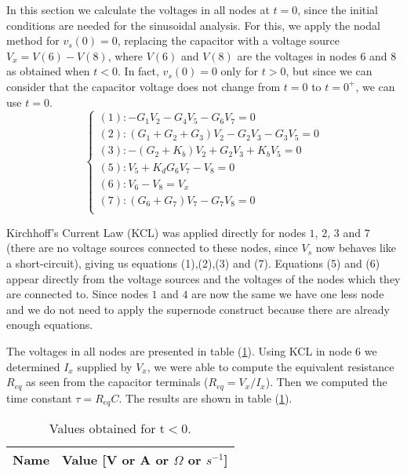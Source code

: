 In this section we calculate the voltages in all nodes at $t=0$, since the initial conditions are needed for the sinusoidal analysis. For this, we apply the nodal method for $v_{s}\left(0\right)=0$, replacing the capacitor with a voltage source $V_{x} = V\left(6\right)-V\left(8\right)$, where $V\left(6\right)$ and $V\left(8\right)$ are the voltages in nodes $6$ and $8$ as obtained when $t<0$. In fact, $v_{s}\left(0\right)=0$ only for $t>0$, but since we can consider that the capacitor voltage does not change from $t=0$ to $t=0^{+}$, we can use $t=0$.
\begin{equation}
  \begin{cases}
    \left(1\right): -G_{1}V_{2}-G_{4}V_{5}-G_{6}V_{7}=0                         \\
    \left(2\right): \left(G_{1}+G_{2}+G_{3}\right)V_{2}-G_{2}V_{3}-G_{3}V_{5}=0 \\
    \left(3\right): -\left(G_{2}+K_{b}\right)V_{2}+G_{2}V_{3}+K_{b}V_{5}=0      \\
    \left(5\right): V_{5}+K_{d}G_{6}V_{7}-V_{8}=0                               \\
    \left(6\right): V_{6}-V_{8}=V_{x}                                           \\
    \left(7\right): \left(G_{6}+G_{7}\right)V_{7}-G_{7}V_{8}=0                  \\
  \end{cases}
\end{equation}

Kirchhoff's Current Law (KCL) was applied directly for nodes $1$, $2$, $3$ and $7$ (there are no voltage sources connected to these nodes, since $V_{s}$ now behaves like a short-circuit), giving us equations (1),(2),(3) and (7). Equations (5) and (6) appear directly from the voltage sources  and the voltages of the nodes which they are connected to. Since nodes $1$ and $4$ are now the same we have one less node and we do not need to apply the supernode construct because there are already enough equations.

The voltages in all nodes are presented in table (\ref{tab:2}).
Using KCL in node $6$ we determined $I_{x}$ supplied by $V_{x}$,
we were able to compute the equivalent resistance $R_{eq}$ as 
seen from the capacitor terminals ($R_{eq}=V_{x}/I_{x}$). 
Then we computed the time constant $\tau=R_{eq}C$. The results are shown in table (\ref{tab:2}). 


\begin{table}[h]
  \centering
  \begin{tabular}{|l|r|}
    \hline
    {\bf Name} & {\bf Value [V or A or $\Omega$ or $s^{-1}$]} \\ \hline
    
  \end{tabular}
  \caption{Values obtained for t$<$0.}
  \label{tab:2}
\end{table}


